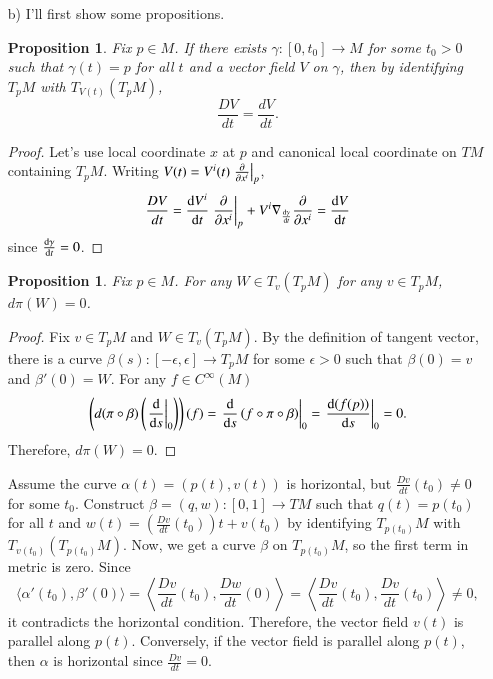 \documentclass[a4paper, 12pt]{article}
\theoremstyle{Mydefinition}
\theoremstyle{Mytheorem}
\newtheorem{proposition}[statement]{Proposition}
\begin{document}
\begin{enumerate}
\begin{enumerate}
        \item[b)] I'll first show some propositions.
        \begin{proposition}\label{Prop:const_curve}
            Fix $p\in M$. If there exists $\gamma:[0,t_0]\rightarrow M$ for some $t_0>0$ such that $\gamma(t) = p$ for all $t$ and a vector field $V$ on $\gamma$, then by identifying $T_pM$ with $T_{V(t)}(T_pM)$,
            \begin{equation}
                \frac{DV}{dt} = \frac{dV}{dt}.
            \end{equation}
        \end{proposition}
        \begin{proof}
            Let's use local coordinate $x$ at $p$ and canonical local coordinate on $TM$ containing $T_p M$. Writing $V(t) = V^i(t)\left.\pdv{x^i}\right|_p$,
                \begin{equation}
                    \frac{DV}{dt} = \dv{V^i}{t}\left.\pdv{x^i}\right|_p + V^i\nabla_{\dv{\gamma}{t}}\pdv{x^i} = \dv{V}{t}
                \end{equation}
            since $\dv{\gamma}{t} = 0$.
        \end{proof}
        
        \begin{proposition}\label{Prop:Const_curve}
            Fix $p\in M$. For any $W\in T_v(T_pM)$ for any $v\in T_pM$, $d\pi (W) = 0$.
        \end{proposition}
        \begin{proof}
        Fix $v\in T_pM$ and $W\in T_v(T_pM)$. By the definition of tangent vector, there is a curve $\beta(s):[-\epsilon,\epsilon]\rightarrow T_{p}M$ for some $\epsilon>0$ such that $\beta(0) = v$ and $\beta'(0) = W$. For any $f\in C^\infty(M)$
        \begin{equation}
            \left(d(\pi\circ \beta)\left(\left.\dv{s}\right|_{0}\right)\right)(f) = \left.\dv{s}\left(f\circ \pi\circ \beta\right)\right|_{0} = \left.\dv{(f(p))}{s}\right|_{0} = 0.
        \end{equation}
        Therefore, $d\pi (W) = 0$.
        \end{proof}
        
        Assume the curve $\alpha(t) = (p(t), v(t))$ is horizontal, but $\frac{Dv}{dt}(t_0)\neq 0$ for some $t_0$. Construct $\beta=(q,w):[0,1]\rightarrow TM$ such that $q(t) = p(t_0)$ for all $t$ and $w(t) = \left(\frac{Dv}{dt}(t_0)\right)t + v(t_0)$ by identifying $T_{p(t_0)}M$ with $T_{v(t_0)}(T_{p(t_0)}M)$. Now, we get a curve $\beta$ on $T_{p(t_0)}M$, so the first term in metric is zero. Since
        \begin{equation}
            \langle \alpha'(t_0), \beta'(0)\rangle = \left\langle \frac{Dv}{dt}(t_0), \frac{Dw}{dt}(0) \right\rangle = \left\langle \frac{Dv}{dt}(t_0), \frac{Dv}{dt}(t_0) \right\rangle\neq 0,
        \end{equation}
        it contradicts the horizontal condition. Therefore, the vector field $v(t)$ is parallel along $p(t)$. Conversely, if the vector field is parallel along $p(t)$, then $\alpha$ is horizontal since $\frac{Dv}{dt} = 0$.
        

\end{enumerate}
\end{enumerate}
\end{document}
